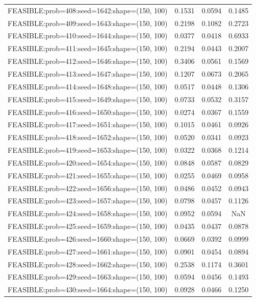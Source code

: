 \begin{longtable}{lccc}
FEASIBLE:prob=408:seed=1642:shape=(150, 100) & 0.1531 & 0.0594 & 0.1485 \\
FEASIBLE:prob=409:seed=1643:shape=(150, 100) & 0.2198 & 0.1082 & 0.2723 \\
FEASIBLE:prob=410:seed=1644:shape=(150, 100) & 0.0377 & 0.0418 & 0.6933 \\
FEASIBLE:prob=411:seed=1645:shape=(150, 100) & 0.2194 & 0.0443 & 0.2007 \\
FEASIBLE:prob=412:seed=1646:shape=(150, 100) & 0.3406 & 0.0561 & 0.1569 \\
FEASIBLE:prob=413:seed=1647:shape=(150, 100) & 0.1207 & 0.0673 & 0.2065 \\
FEASIBLE:prob=414:seed=1648:shape=(150, 100) & 0.0517 & 0.0448 & 0.1306 \\
FEASIBLE:prob=415:seed=1649:shape=(150, 100) & 0.0733 & 0.0532 & 0.3157 \\
FEASIBLE:prob=416:seed=1650:shape=(150, 100) & 0.0274 & 0.0367 & 0.1559 \\
FEASIBLE:prob=417:seed=1651:shape=(150, 100) & 0.1015 & 0.0461 & 0.0926 \\
FEASIBLE:prob=418:seed=1652:shape=(150, 100) & 0.0520 & 0.0341 & 0.0923 \\
FEASIBLE:prob=419:seed=1653:shape=(150, 100) & 0.0322 & 0.0368 & 0.1214 \\
FEASIBLE:prob=420:seed=1654:shape=(150, 100) & 0.0848 & 0.0587 & 0.0829 \\
FEASIBLE:prob=421:seed=1655:shape=(150, 100) & 0.0255 & 0.0469 & 0.0958 \\
FEASIBLE:prob=422:seed=1656:shape=(150, 100) & 0.0486 & 0.0452 & 0.0943 \\
FEASIBLE:prob=423:seed=1657:shape=(150, 100) & 0.0798 & 0.0457 & 0.1126 \\
FEASIBLE:prob=424:seed=1658:shape=(150, 100) & 0.0952 & 0.0594 &    NaN \\
FEASIBLE:prob=425:seed=1659:shape=(150, 100) & 0.0435 & 0.0437 & 0.0878 \\
FEASIBLE:prob=426:seed=1660:shape=(150, 100) & 0.0669 & 0.0392 & 0.0999 \\
FEASIBLE:prob=427:seed=1661:shape=(150, 100) & 0.0901 & 0.0454 & 0.0894 \\
FEASIBLE:prob=428:seed=1662:shape=(150, 100) & 0.2538 & 0.1174 & 0.3601 \\
FEASIBLE:prob=429:seed=1663:shape=(150, 100) & 0.0594 & 0.0456 & 0.1493 \\
FEASIBLE:prob=430:seed=1664:shape=(150, 100) & 0.0928 & 0.0466 & 0.1250 \\

\end{longtable}
